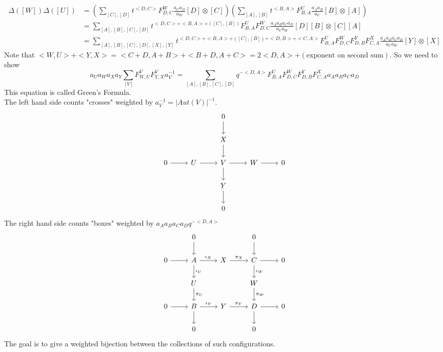 \documentclass{book}
\begin{document}
\begin{align*} 
\Delta ([W]) \Delta([U]) &=  \left(\sum_{[C],[D]} t^{<D,C>} F^W_{D,C}  \frac{a_C a_D}{a_W} [D] \otimes [C]\right) \left(\sum_{[A],[B]} t^{<B,A>} F^U_{B,A}  \frac{a_A a_B}{a_U} [B] \otimes [A] \right) \\
&= \sum_{[A],[B],[C],[D]} t^{<D,C>+<B,A>+([C],[B])} F^U_{B,A}  F^W_{D,C} \frac{a_A a_B a_C a_D}{a_U a_W} [D][B] \otimes [C][A]\\
&=  \sum_{[A],[B],[C],[D],[X],[Y]} t^{<D,C>+<B,A>+([C],[B])+<D,B>+<C,A>} F^U_{B,A}  F^W_{D,C} F^Y_{D,B} F^X_{C,A} \frac{a_A a_B a_C a_D}{a_U a_W} [Y] \otimes [X]
\end{align*}
Note that $<W,U>+<Y,X>=<C+D,A+B>+<B+D,A+C> = 2<D,A> +(\text{exponent on second sum}).$
So we need to show
$$a_Ua_Wa_Xa_Y \sum_{[V]} F^V_{W,U} F^V_{Y,X}a_V^{-1} = \sum_{[A],[B],[C],[D]}q^{-<D,A>} F^U_{B,A} F^W_{D,C} F^Y_{D,B} F^X_{C,A} a_Aa_Ba_Ca_D$$  
This equation is called Green's Formula. \\
The left hand side counts "crosses" weighted by $a_V^{-1}=|Aut(V)|^{-1}.$ 
 \[\begin{tikzcd}
             & & 0\arrow{d}& &  \\
	 & & X\arrow{d}& &  \\
	0 \arrow{r} & U\arrow{r} &V \arrow{d} \arrow{r}& W \arrow{r}& 0 \\
           & & Y\arrow{d}& &  \\
	& & 0& &  
            \end{tikzcd}\]
The right hand side counts "boxes" weighted by $a_Aa_Ba_Ca_D q^{-<D,A>}$
 \[\begin{tikzcd}
             &  0\arrow{d}& &0\arrow{d} &  \\
	0 \arrow{r} & A \arrow{r}{\iota_X} \arrow{d}{\iota_U}& X\arrow{r}{\pi_X}& C\arrow{r}\arrow{d}{\iota_W}& 0 \\
	& U\arrow{d}{\pi_U} & & W \arrow{d}{\pi_W}&  \\
           0 \arrow{r} & B \arrow{r}{\iota_Y} \arrow{d}& Y\arrow{r}{\pi_Y}& D\arrow{r}\arrow{d}& 0 \\
	& 0 & & 0&  
            \end{tikzcd}\]
The goal is to give a weighted bijection between the collections of such configurations. 
\end{document}
